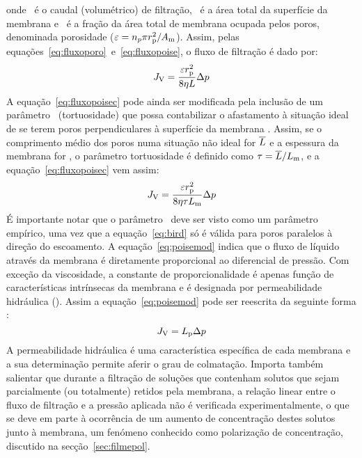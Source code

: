 onde \caudal\ é o caudal (volumétrico) de filtração, \areamembrana\ é a área total da superfície da membrana e \porosidade\ é a fração da área total de membrana ocupada pelos poros, denominada porosidade ($\varepsilon=n_p\pi r_{\mathrm{p}}^2/A_{\mathrm{m}}$). 
Assim, pelas equações~\ref{eq:fluxoporo}~e~\ref{eq:fluxopoise}, o fluxo de filtração é dado por:
\begin{equation}
 	\label{eq:fluxopoisec}
 	J_{\mathrm{V}}=\frac{\varepsilon r_{\mathrm{p}}^2}{8\eta L}\Delta p
\end{equation} 
A equação~\ref{eq:fluxopoisec} pode ainda ser modificada pela inclusão de um parâmetro \tortuosidade\ (tortuosidade) que possa contabilizar o afastamento à situação ideal de se terem poros perpendiculares à superfície da membrana \cite{mulder}.
Assim, se o comprimento médio dos poros numa situação não ideal for $\overline{L}$ e a espessura da membrana for \commembrana, o parâmetro tortuosidade é definido como $\tau=\overline{L}/L_{\mathrm{m}}$, e a equação~\ref{eq:fluxopoisec} vem assim:
\begin{equation}
	\label{eq:poisemod}
	J_{\mathrm{V}}=\frac{\varepsilon r_{\mathrm{p}}^2}{8\eta\tau L_{\mathrm{m}}}\Delta p
\end{equation}
É importante notar que o parâmetro \tortuosidade\ deve ser visto como um parâmetro empírico, uma vez que a equação~\ref{eq:bird} só é válida para poros paralelos à direção do escoamento. A equação~\ref{eq:poisemod} indica que o fluxo de líquido através da membrana é diretamente proporcional ao diferencial de pressão. Com exceção da viscosidade, a constante de proporcionalidade é apenas função de características intrínsecas da membrana e é designada por permeabilidade hidráulica (\permhidra). 
Assim a equação~\ref{eq:poisemod} pode ser reescrita da seguinte forma \cite{latu09}:
\begin{equation}
	\label{eq:permhidro}
	J_{\mathrm{V}}=L_{\mathrm{p}}\Delta p
\end{equation}
A permeabilidade hidráulica é uma característica específica de cada membrana e a sua determinação permite aferir o grau de colmatação. Importa também salientar que durante a filtração de soluções que contenham solutos que sejam parcialmente (ou totalmente) retidos pela membrana, a relação linear entre o fluxo de filtração e a pressão aplicada não é verificada experimentalmente, o que se deve em parte à ocorrência de um aumento de concentração destes solutos junto à membrana, um fenómeno conhecido como polarização de concentração, discutido na secção~\ref{sec:filmepol}. 

